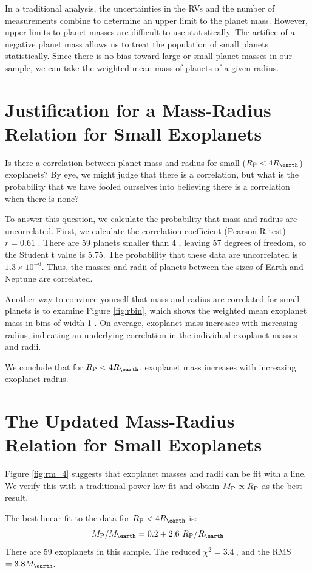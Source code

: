 \documentclass[11pt]{aastex}
\newcommand{\rspecial}{4 \rearth}
\newcommand{\chisquared}{3.4~}
\newcommand{\rms}{3.8 \mearth}
\begin{document}
In a traditional analysis, the uncertainties in the RVs and the number of measurements combine to determine an upper limit to the planet mass.  However, upper limits to planet masses are difficult to use statistically.  The artifice of a negative planet mass allows us to treat the population of small planets statistically.  Since there is no bias toward large or small planet masses in our sample, we can take the weighted mean mass of planets of a given radius.

\section{Justification for a Mass-Radius Relation for Small Exoplanets}
Is there a correlation between planet mass and radius for small ($\rpl < \rspecial$) exoplanets?  By eye, we might judge that there is a correlation, but what is the probability that we have fooled ourselves into believing there is a correlation when there is none?

To answer this question, we calculate the probability that mass and radius are uncorrelated.  First, we calculate the correlation coefficient (Pearson R test) $r=0.61$ .  There are 59 planets smaller than 4 \rearth, leaving 57 degrees of freedom, so the Student t value is 5.75.  The probability that these data are uncorrelated is $1.3 \times 10^{-6}$.  Thus, the masses and radii of planets between the sizes of Earth and Neptune are correlated.

Another way to convince yourself that mass and radius are correlated for small planets is to examine Figure \ref{fig:rbin}, which shows the weighted mean exoplanet mass in bins of width 1 \rearth.  On average, exoplanet mass increases with increasing radius, indicating an underlying correlation in the individual exoplanet masses and radii.

We conclude that for $\rpl < 4 \rearth$, exoplanet mass increases with increasing exoplanet radius.

\section{The Updated Mass-Radius Relation for Small Exoplanets}
Figure \ref{fig:rm_4} suggests that exoplanet masses and radii can be fit with a line.  We verify this with a traditional power-law fit and obtain $M_{\rm P} \propto R_{\rm P}$ as the best result.

The best linear fit to the data for $\rpl < \rspecial$ is:
$$
\mpl/\mearth = 0.2  +     2.6~\rpl/\rearth
$$
There are 59 exoplanets in this sample.  The reduced $\chi^2=\chisquared$, and the RMS $=\rms$.
\end{document}
